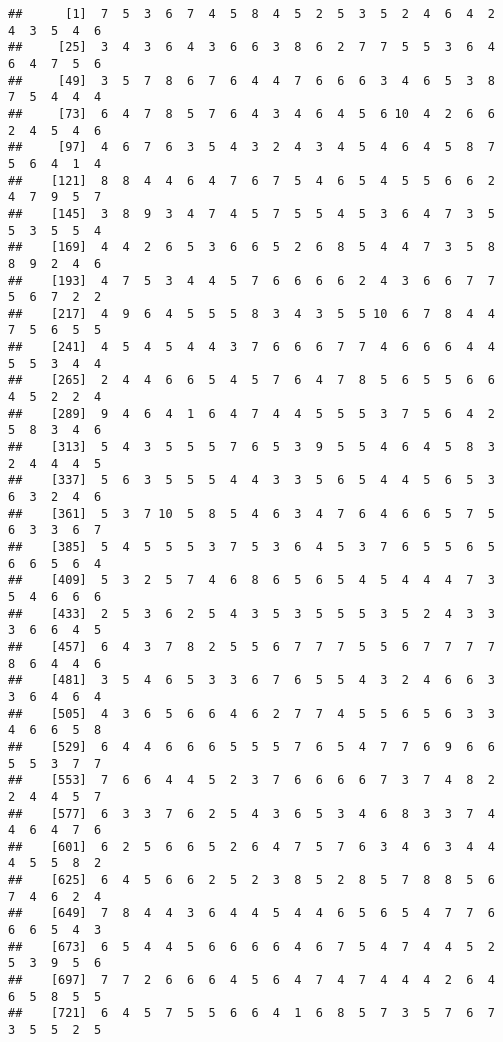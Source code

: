 \documentclass[
]{book}
\begin{document}
\begin{verbatim}
##      [1]  7  5  3  6  7  4  5  8  4  5  2  5  3  5  2  4  6  4  2  4  3  5  4  6
##     [25]  3  4  3  6  4  3  6  6  3  8  6  2  7  7  5  5  3  6  4  6  4  7  5  6
##     [49]  3  5  7  8  6  7  6  4  4  7  6  6  6  3  4  6  5  3  8  7  5  4  4  4
##     [73]  6  4  7  8  5  7  6  4  3  4  6  4  5  6 10  4  2  6  6  2  4  5  4  6
##     [97]  4  6  7  6  3  5  4  3  2  4  3  4  5  4  6  4  5  8  7  5  6  4  1  4
##    [121]  8  8  4  4  6  4  7  6  7  5  4  6  5  4  5  5  6  6  2  4  7  9  5  7
##    [145]  3  8  9  3  4  7  4  5  7  5  5  4  5  3  6  4  7  3  5  5  3  5  5  4
##    [169]  4  4  2  6  5  3  6  6  5  2  6  8  5  4  4  7  3  5  8  8  9  2  4  6
##    [193]  4  7  5  3  4  4  5  7  6  6  6  6  2  4  3  6  6  7  7  5  6  7  2  2
##    [217]  4  9  6  4  5  5  5  8  3  4  3  5  5 10  6  7  8  4  4  7  5  6  5  5
##    [241]  4  5  4  5  4  4  3  7  6  6  6  7  7  4  6  6  6  4  4  5  5  3  4  4
##    [265]  2  4  4  6  6  5  4  5  7  6  4  7  8  5  6  5  5  6  6  4  5  2  2  4
##    [289]  9  4  6  4  1  6  4  7  4  4  5  5  5  3  7  5  6  4  2  5  8  3  4  6
##    [313]  5  4  3  5  5  5  7  6  5  3  9  5  5  4  6  4  5  8  3  2  4  4  4  5
##    [337]  5  6  3  5  5  5  4  4  3  3  5  6  5  4  4  5  6  5  3  6  3  2  4  6
##    [361]  5  3  7 10  5  8  5  4  6  3  4  7  6  4  6  6  5  7  5  6  3  3  6  7
##    [385]  5  4  5  5  5  3  7  5  3  6  4  5  3  7  6  5  5  6  5  6  6  5  6  4
##    [409]  5  3  2  5  7  4  6  8  6  5  6  5  4  5  4  4  4  7  3  5  4  6  6  6
##    [433]  2  5  3  6  2  5  4  3  5  3  5  5  5  3  5  2  4  3  3  3  6  6  4  5
##    [457]  6  4  3  7  8  2  5  5  6  7  7  7  5  5  6  7  7  7  7  8  6  4  4  6
##    [481]  3  5  4  6  5  3  3  6  7  6  5  5  4  3  2  4  6  6  3  3  6  4  6  4
##    [505]  4  3  6  5  6  6  4  6  2  7  7  4  5  5  6  5  6  3  3  4  6  6  5  8
##    [529]  6  4  4  6  6  6  5  5  5  7  6  5  4  7  7  6  9  6  6  5  5  3  7  7
##    [553]  7  6  6  4  4  5  2  3  7  6  6  6  6  7  3  7  4  8  2  2  4  4  5  7
##    [577]  6  3  3  7  6  2  5  4  3  6  5  3  4  6  8  3  3  7  4  4  6  4  7  6
##    [601]  6  2  5  6  6  5  2  6  4  7  5  7  6  3  4  6  3  4  4  4  5  5  8  2
##    [625]  6  4  5  6  6  2  5  2  3  8  5  2  8  5  7  8  8  5  6  7  4  6  2  4
##    [649]  7  8  4  4  3  6  4  4  5  4  4  6  5  6  5  4  7  7  6  6  6  5  4  3
##    [673]  6  5  4  4  5  6  6  6  6  4  6  7  5  4  7  4  4  5  2  5  3  9  5  6
##    [697]  7  7  2  6  6  6  4  5  6  4  7  4  7  4  4  4  2  6  4  6  5  8  5  5
##    [721]  6  4  5  7  5  5  6  6  4  1  6  8  5  7  3  5  7  6  7  3  5  5  2  5

\end{verbatim}
\end{document}
